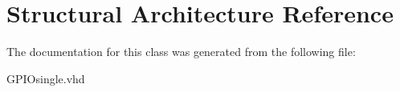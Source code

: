 \hypertarget{class_g_p_i_osingle_1_1_structural}{\section{Structural Architecture Reference}
\label{class_g_p_i_osingle_1_1_structural}
}


The documentation for this class was generated from the following file\+:\begin{DoxyCompactItemize}
\item 
G\+P\+I\+Osingle.\+vhd\end{DoxyCompactItemize}
